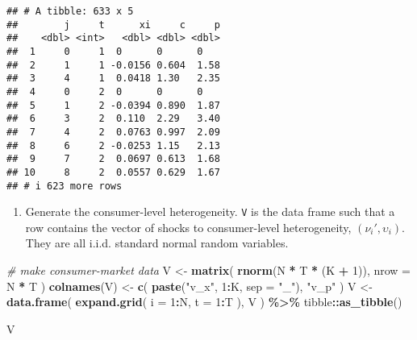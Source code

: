 \documentclass[
]{book}
\newenvironment{Shaded}{\begin{snugshade}}{\end{snugshade}}
\newcommand{\AttributeTok}[1]{\textcolor[rgb]{0.13,0.29,0.53}{#1}}
\newcommand{\CommentTok}[1]{\textcolor[rgb]{0.56,0.35,0.01}{\textit{#1}}}
\newcommand{\DecValTok}[1]{\textcolor[rgb]{0.00,0.00,0.81}{#1}}
\newcommand{\FunctionTok}[1]{\textcolor[rgb]{0.13,0.29,0.53}{\textbf{#1}}}
\newcommand{\NormalTok}[1]{#1}
\newcommand{\OtherTok}[1]{\textcolor[rgb]{0.56,0.35,0.01}{#1}}
\newcommand{\SpecialCharTok}[1]{\textcolor[rgb]{0.81,0.36,0.00}{\textbf{#1}}}
\newcommand{\StringTok}[1]{\textcolor[rgb]{0.31,0.60,0.02}{#1}}
\providecommand{\tightlist}{%
  \setlength{\itemsep}{0pt}\setlength{\parskip}{0pt}}
\begin{document}
\begin{verbatim}
## # A tibble: 633 x 5
##        j     t      xi     c     p
##    <dbl> <int>   <dbl> <dbl> <dbl>
##  1     0     1  0      0      0   
##  2     1     1 -0.0156 0.604  1.58
##  3     4     1  0.0418 1.30   2.35
##  4     0     2  0      0      0   
##  5     1     2 -0.0394 0.890  1.87
##  6     3     2  0.110  2.29   3.40
##  7     4     2  0.0763 0.997  2.09
##  8     6     2 -0.0253 1.15   2.13
##  9     7     2  0.0697 0.613  1.68
## 10     8     2  0.0557 0.629  1.67
## # i 623 more rows
\end{verbatim}

\begin{enumerate}
\def\labelenumi{\arabic{enumi}.}
\setcounter{enumi}{3}
\tightlist
\item
  Generate the consumer-level heterogeneity. \texttt{V} is the data frame such that a row contains the vector of shocks to consumer-level heterogeneity, \((\nu_{i}', \upsilon_i)\). They are all i.i.d. standard normal random variables.
\end{enumerate}

\begin{Shaded}
\begin{Highlighting}[]
\CommentTok{\# make consumer{-}market data}
\NormalTok{V }\OtherTok{\textless{}{-}} 
  \FunctionTok{matrix}\NormalTok{(}
    \FunctionTok{rnorm}\NormalTok{(N }\SpecialCharTok{*}\NormalTok{ T }\SpecialCharTok{*}\NormalTok{ (K }\SpecialCharTok{+} \DecValTok{1}\NormalTok{)), }
    \AttributeTok{nrow =}\NormalTok{ N }\SpecialCharTok{*}\NormalTok{ T}
\NormalTok{    ) }
\FunctionTok{colnames}\NormalTok{(V) }\OtherTok{\textless{}{-}} 
  \FunctionTok{c}\NormalTok{(}
    \FunctionTok{paste}\NormalTok{(}\StringTok{"v\_x"}\NormalTok{, }\DecValTok{1}\SpecialCharTok{:}\NormalTok{K, }\AttributeTok{sep =} \StringTok{"\_"}\NormalTok{), }
    \StringTok{"v\_p"}
\NormalTok{    )}
\NormalTok{V }\OtherTok{\textless{}{-}} 
  \FunctionTok{data.frame}\NormalTok{(}
    \FunctionTok{expand.grid}\NormalTok{(}
      \AttributeTok{i =} \DecValTok{1}\SpecialCharTok{:}\NormalTok{N, }
      \AttributeTok{t =} \DecValTok{1}\SpecialCharTok{:}\NormalTok{T}
\NormalTok{      ),}
\NormalTok{    V}
\NormalTok{    ) }\SpecialCharTok{\%\textgreater{}\%}
\NormalTok{  tibble}\SpecialCharTok{::}\FunctionTok{as\_tibble}\NormalTok{()}
\end{Highlighting}
\end{Shaded}

\begin{Shaded}
\begin{Highlighting}[]
\NormalTok{V}
\end{Highlighting}
\end{Shaded}
\end{document}
